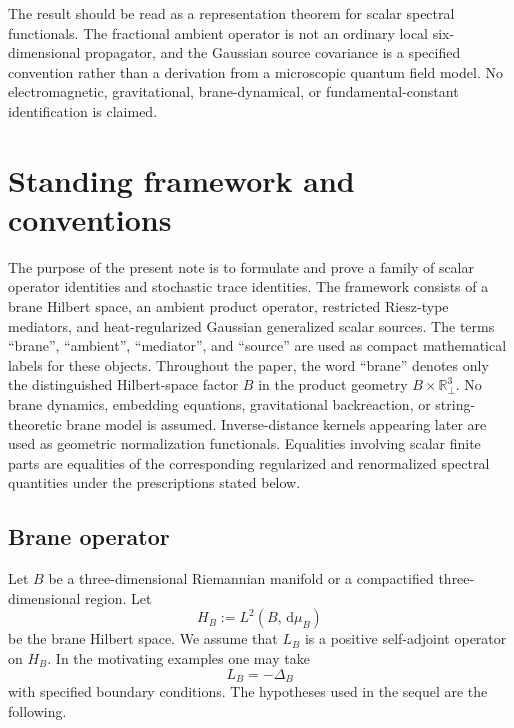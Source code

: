\documentclass[11pt]{article}
\newcommand{\R}{\mathbb{R}}
\newcommand{\dd}{\,\mathrm{d}}
\begin{document}
The result should be read as a representation theorem for scalar spectral
functionals.  The fractional ambient operator is not an ordinary local
six-dimensional propagator, and the Gaussian source covariance is a specified
convention rather than a derivation from a microscopic quantum field model.
No electromagnetic, gravitational, brane-dynamical, or fundamental-constant
identification is claimed.

\section{Standing framework and conventions}
\label{sec:framework}

The purpose of the present note is to formulate and prove a family of scalar operator identities and stochastic trace identities.  The framework consists of a brane Hilbert space, an ambient product operator, restricted Riesz-type mediators, and heat-regularized Gaussian generalized scalar sources.  The terms ``brane'', ``ambient'', ``mediator'', and ``source'' are used as compact mathematical labels for these objects.  Throughout the paper, the word ``brane'' denotes only the distinguished Hilbert-space factor \(B\) in the product geometry \(B\times\R^3_\perp\).  No brane dynamics, embedding equations, gravitational backreaction, or string-theoretic brane model is assumed.  Inverse-distance kernels appearing later are used as geometric normalization functionals.  Equalities involving scalar finite parts are equalities of the corresponding regularized and renormalized spectral quantities under the prescriptions stated below.

\subsection{Brane operator}

Let $B$ be a three-dimensional Riemannian manifold or a compactified three-dimensional region.  Let
\[
    H_B := L^2(B,\dd\mu_B)
\]
be the brane Hilbert space.  We assume that $L_B$ is a positive self-adjoint operator on $H_B$.  In the motivating examples one may take
\[
    L_B=-\Delta_B
\]
with specified boundary conditions.  The hypotheses used in the sequel are the following.
\end{document}
